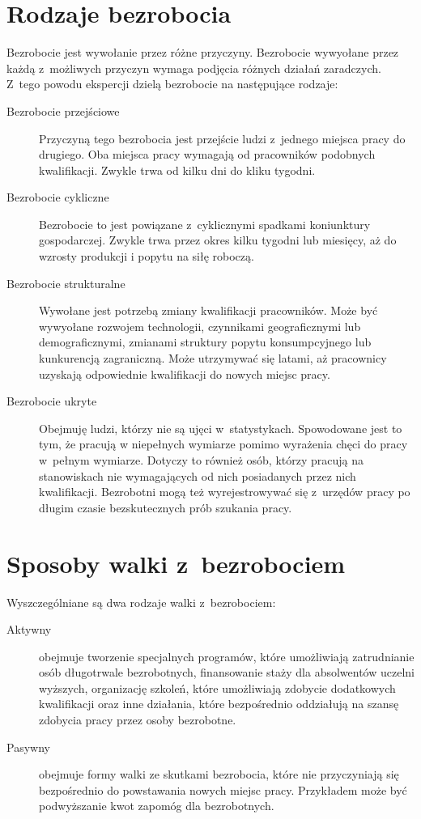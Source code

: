 \documentclass[12pt]{article}
\begin{document}
    \section*{Rodzaje bezrobocia}
    Bezrobocie jest wywołanie przez różne przyczyny. Bezrobocie wywyołane przez każdą z~możliwych przyczyn wymaga podjęcia różnych działań zaradczych. Z~tego powodu ekspercji dzielą bezrobocie na następujące rodzaje\cite{eko}:
    \begin{description}
        \item[Bezrobocie przejściowe] Przyczyną tego bezrobocia jest przejście ludzi z~jednego miejsca pracy do drugiego. Oba miejsca pracy wymagają od pracowników podobnych kwalifikacji. Zwykle trwa od kilku dni do kliku tygodni.
        \item[Bezrobocie cykliczne] Bezrobocie to jest powiązane z~cyklicznymi spadkami koniunktury gospodarczej. Zwykle trwa przez okres kilku tygodni lub miesięcy, aż do wzrosty produkcji i popytu na siłę roboczą.
        \item[Bezrobocie strukturalne] Wywołane jest potrzebą zmiany kwalifikacji pracowników. Może być wywyołane rozwojem technologii, czynnikami geograficznymi lub demograficznymi, zmianami struktury popytu konsumpcyjnego lub kunkurencją zagraniczną. Może utrzymywać się latami, aż pracownicy uzyskają odpowiednie kwalifikacji do nowych miejsc pracy.
        \item[Bezrobocie ukryte] Obejmuję ludzi, którzy nie są ujęci w~statystykach. Spowodowane jest to tym, że pracują w niepełnych wymiarze pomimo wyrażenia chęci do pracy w~pełnym wymiarze. Dotyczy to również osób, którzy pracują na stanowiskach nie wymagających od nich posiadanych przez nich kwalifikacji. Bezrobotni mogą też wyrejestrowywać się z~urzędów pracy po długim czasie bezskutecznych prób szukania pracy.
    \end{description}

    \section*{Sposoby walki z~bezrobociem}
    
    Wyszczególniane są dwa rodzaje walki z~bezrobociem:
    
    \begin{description}
        \item[Aktywny] obejmuje tworzenie specjalnych programów, które umożliwiają zatrudnianie osób długotrwale bezrobotnych, finansowanie staży dla absolwentów uczelni wyższych, organizację szkoleń, które umożliwiają zdobycie dodatkowych kwalifikacji oraz inne działania, które bezpośrednio oddziałują na szansę zdobycia pracy przez osoby bezrobotne.
        \item[Pasywny] obejmuje formy walki ze skutkami bezrobocia, które nie przyczyniają się bezpośrednio do powstawania nowych miejsc pracy. Przykładem może być podwyższanie kwot zapomóg dla bezrobotnych.
    \end{description}
   
\end{document}
